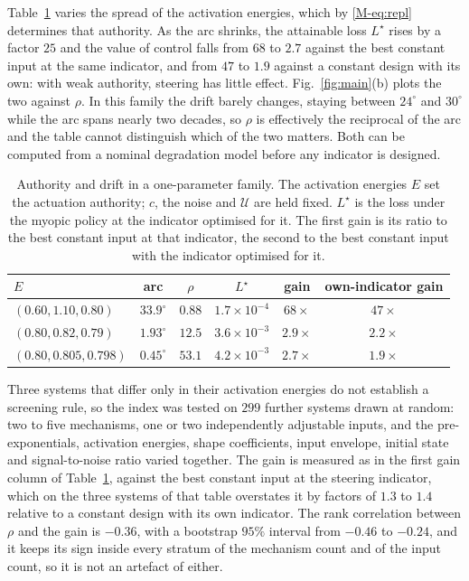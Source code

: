 \documentclass[12pt]{article}
\begin{document}
Table~\ref{tab:regime} varies the spread of the activation energies, which by
\eqref{M-eq:repl} determines that authority. As the arc shrinks, the
attainable loss $L^{\star}$ rises by a factor $25$ and the value of control
falls from $68$ to $2.7$ against the best constant input at the same
indicator, and from $47$ to $1.9$ against a constant design with its own:
with weak authority, steering has little effect.
Fig.~\ref{fig:main}(b) plots the two against $\rho$. In this family the drift barely changes, staying between $24^{\circ}$ and $30^{\circ}$ while the arc spans nearly two decades, so $\rho$ is effectively the reciprocal of the arc and the table cannot distinguish which of the two matters. Both can be computed from a nominal degradation model before any indicator is designed.

\begin{table}[tb]
\caption{Authority and drift in a one-parameter family. The activation energies $E$ set the actuation authority; $c$, the noise and $\mathcal U$ are held fixed. $L^{\star}$ is the loss under the myopic policy at the indicator optimised for it. The first gain is its ratio to the best constant input at that indicator, the second to the best constant input with the indicator optimised for it.}
\label{tab:regime}
\centering
\small
\setlength{\tabcolsep}{4pt}
\begin{tabular}{lccccc}
\hline
$E$ & arc & $\rho$ & $L^{\star}$ & gain & own-indicator gain\\
\hline
$(0.60,1.10,0.80)$ & $33.9^{\circ}$ & $0.88$ & $1.7\times10^{-4}$ & $68\times$ & $47\times$\\
$(0.80,0.82,0.79)$ & $1.93^{\circ}$ & $12.5$ & $3.6\times10^{-3}$ & $2.9\times$ & $2.2\times$\\
$(0.80,0.805,0.798)$ & $0.45^{\circ}$ & $53.1$ & $4.2\times10^{-3}$ & $2.7\times$ & $1.9\times$\\
\hline
\end{tabular}
\end{table}

Three systems that differ only in their activation energies do not establish
a screening rule, so the index was tested on $299$ further systems drawn at random: two to
five mechanisms, one or two independently adjustable inputs, and the
pre-exponentials, activation energies, shape coefficients, input envelope,
initial state and signal-to-noise ratio varied together. The gain is measured
as in the first gain column of Table~\ref{tab:regime}, against the best
constant input at the steering indicator, which on the three systems of that
table overstates it by factors of $1.3$ to $1.4$ relative to a constant design
with its own indicator. The rank correlation between $\rho$ and the gain is $-0.36$, with a
bootstrap $95\%$ interval from $-0.46$ to $-0.24$, and it keeps its sign inside
every stratum of the mechanism count and of the input count, so it is not an
artefact of either.
\end{document}

